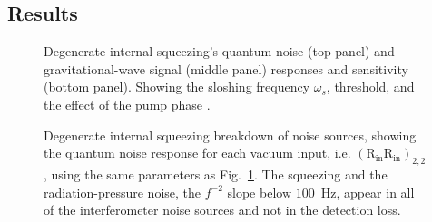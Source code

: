 \subsection{Results}
\label{sec:dIS_results}


\begin{figure}
	\centering
	\caption{Degenerate internal squeezing's quantum noise (top panel) and gravitational-wave signal (middle panel) responses and sensitivity (bottom panel). Showing the sloshing frequency $\omega_s$, threshold, and the effect of the pump phase . }
	\label{fig:dIS_sensitivity}
\end{figure}

\begin{figure}
	\centering
	\caption{Degenerate internal squeezing breakdown of noise sources, showing the quantum noise response for each vacuum input, i.e. $(\text{R}_\text{in}\text{R}_\text{in})_{2,2}$, using the same parameters as Fig.~\ref{fig:dIS_sensitivity}. The squeezing and the radiation-pressure noise, the $f^{-2}$ slope below $100$~Hz, appear in all of the interferometer noise sources and not in the detection loss.}
	\label{fig:dIS_noise_budget}
\end{figure}

